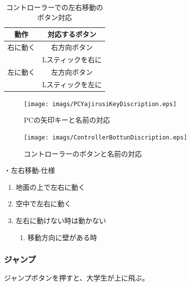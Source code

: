 \documentclass[12pt]{jsarticle}
\begin{document}
\begin{table}[htbp]
  \centering
  \caption{コントローラーでの左右移動のボタン対応}
  \begin{tabular}{cc}
    \toprule
    動作 & 対応するボタン\\
    \midrule
    右に動く & 右方向ボタン \\
      & Lスティックを右に \\
    \midrule
    左に動く & 左方向ボタン \\
      & Lスティックを左に \\
    \bottomrule
  \end{tabular}
\end{table}

\newpage

\begin{figure}[htbp]
  \begin{center}
    \texttt{[image: imags/PCYajirusiKeyDiscription.eps]}
  \end{center}
  \caption{PCの矢印キーと名前の対応}
\end{figure}
\begin{figure}
    \begin{center}
    \texttt{[image: imags/ControllerBottunDiscription.eps]}
  \end{center}
  \caption{コントローラーのボタンと名前の対応}
\end{figure}

\newpage

・左右移動-仕様
\begin{enumerate}
  \item 地面の上で左右に動く
  \item 空中で左右に動く
  \item 左右に動けない時は動かない
  \begin{enumerate}
    \item 移動方向に壁がある時
  \end{enumerate}
\end{enumerate}

\newpage

\subsubsection{ジャンプ}

ジャンプボタンを押すと、大学生が上に飛ぶ。
\end{document}
